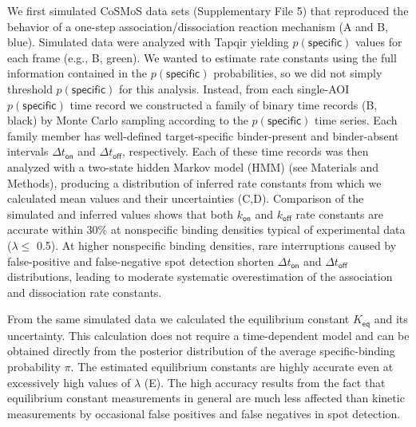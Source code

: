 We first simulated CoSMoS data sets (Supplementary File 5) that reproduced the behavior of a one-step association/dissociation reaction mechanism (A and B, blue). Simulated data were analyzed with Tapqir yielding $p(\mathsf{specific})$ values for each frame (e.g., B, green). We wanted to estimate rate constants using the full information contained in the $p(\mathsf{specific})$ probabilities, so we did not simply threshold $p(\mathsf{specific})$ for this analysis.  Instead, from each single-AOI $p(\mathsf{specific})$ time record we constructed a family of binary time records (B, black) by Monte Carlo sampling according to the  $p(\mathsf{specific})$ time series. Each family member has well-defined target-specific binder-present and binder-absent intervals $\Delta t_\mathsf{on}$ and $\Delta t_\mathsf{off}$, respectively. Each of these time records was then analyzed with a two-state hidden Markov model (HMM) (see Materials and Methods), producing a distribution of inferred rate constants from which we calculated mean values and their uncertainties (C,D). Comparison of the simulated and inferred values shows that both $k_\mathsf{on}$ and $k_\mathsf{off}$ rate constants are accurate within 30\% at nonspecific binding densities typical of experimental data ($\lambda \leq$ 0.5). At higher nonspecific binding densities, rare interruptions caused by false-positive and false-negative spot detection shorten $\Delta t_\mathsf{on}$ and $\Delta t_\mathsf{off}$ distributions, leading to moderate systematic overestimation of the association and dissociation rate constants.

From the same simulated data we calculated the equilibrium constant $K_\mathsf{eq}$ and its uncertainty. This calculation does not require a time-dependent model and can be obtained directly from the posterior distribution of the average specific-binding probability $\pi$. The estimated equilibrium constants are highly accurate even at excessively high values of $\lambda$ (E).  The high accuracy results from the fact that equilibrium constant measurements in general are much less affected than kinetic measurements by occasional false positives and false negatives in spot detection. 

